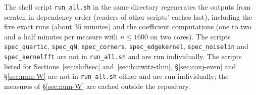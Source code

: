 The shell script \texttt{run\_all.sh} in the same directory regenerates the outputs from scratch in dependency order
(readers of other scripts' caches last), including the five exact runs (about $35$ minutes) and the coefficient
computations (one to two and a half minutes per measure with $n\le1600$ on two cores). The scripts \texttt{spec\_quartic},
\texttt{spec\_qN}, \texttt{spec\_corners}, \texttt{spec\_edgekernel}, \texttt{spec\_noiselin} and \texttt{spec\_kernelfft} are not in
\texttt{run\_all.sh} and are run individually.
The scripts listed for Sections~\ref{sec:shiftsec} and~\ref{sec:hurwitz-thm}, \S\ref{sec:conj-even} and \S\ref{sec:num-W} are
not in \texttt{run\_all.sh} either and are run individually; the measures of \S\ref{sec:num-W} are cached outside the repository.
